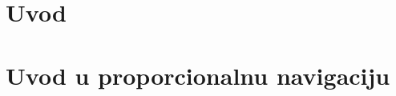 \documentclass[12pt, twoside]{report}
\begin{document}





\tableofcontents



%

\chapter[]{Uvod}


\chapter{Uvod u proporcionalnu navigaciju}



\nocite{*}
\printbibliography
\end{document}
